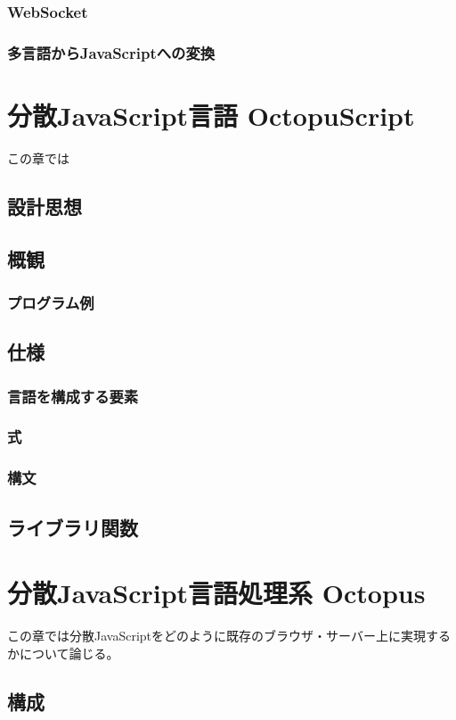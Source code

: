 \documentclass[a4j,12pt]{jreport}
\begin{document}
\subsection{WebSocket}
\subsection{多言語からJavaScriptへの変換}


\chapter{分散JavaScript言語 OctopuScript}
この章では
\section{設計思想}
\section{概観}
\subsection{プログラム例}
\section{仕様}
\subsection{言語を構成する要素}
\subsection{式}
\subsection{構文}
\section{ライブラリ関数}

\chapter{分散JavaScript言語処理系 Octopus}
この章では分散JavaScriptをどのように既存のブラウザ・サーバー上に実現するかについて論じる。
\section{構成}
\end{document}
